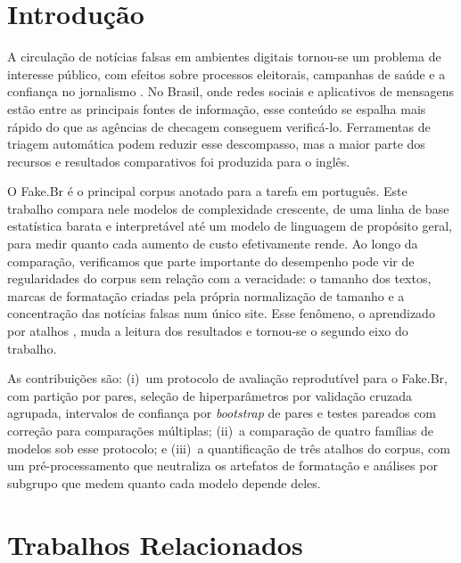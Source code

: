 \section{Introdução}

A circulação de notícias falsas em ambientes digitais tornou-se um problema de interesse público, com efeitos sobre processos eleitorais, campanhas de saúde e a confiança no jornalismo \citep{shu2017,zhou2020}. No Brasil, onde redes sociais e aplicativos de mensagens estão entre as principais fontes de informação, esse conteúdo se espalha mais rápido do que as agências de checagem conseguem verificá-lo. Ferramentas de triagem automática podem reduzir esse descompasso, mas a maior parte dos recursos e resultados comparativos foi produzida para o inglês.

O Fake.Br \citep{monteiro2018} é o principal corpus anotado para a tarefa em português. Este trabalho compara nele modelos de complexidade crescente, de uma linha de base estatística barata e interpretável até um modelo de linguagem de propósito geral, para medir quanto cada aumento de custo efetivamente rende. Ao longo da comparação, verificamos que parte importante do desempenho pode vir de regularidades do corpus sem relação com a veracidade: o tamanho dos textos, marcas de formatação criadas pela própria normalização de tamanho e a concentração das notícias falsas num único site. Esse fenômeno, o aprendizado por atalhos \citep{geirhos2020}, muda a leitura dos resultados e tornou-se o segundo eixo do trabalho.

As contribuições são: (i)~um protocolo de avaliação reprodutível para o Fake.Br, com partição por pares, seleção de hiperparâmetros por validação cruzada agrupada, intervalos de confiança por \emph{bootstrap} de pares e testes pareados com correção para comparações múltiplas; (ii)~a comparação de quatro famílias de modelos sob esse protocolo; e (iii)~a quantificação de três atalhos do corpus, com um pré-processamento que neutraliza os artefatos de formatação e análises por subgrupo que medem quanto cada modelo depende deles.

\section{Trabalhos Relacionados}

